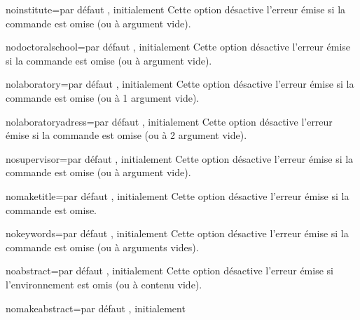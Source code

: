 \begin{description}
\begin{docKey}{noinstitute}{=\textbar{}}{par
    défaut , initialement }
  Cette option désactive l'erreur émise si la commande  est
  omise (ou à argument vide).
\end{docKey}
\begin{docKey}{nodoctoralschool}{=\textbar{}}{par
    défaut , initialement }
  Cette option désactive l'erreur émise si la commande 
  est omise (ou à argument vide).
\end{docKey}
\begin{docKey}{nolaboratory}{=\textbar{}}{par
    défaut , initialement }
  Cette option désactive l'erreur émise si la commande  est
  omise (ou à 1\ier{} argument vide).
\end{docKey}
\begin{docKey}{nolaboratoryadress}{=\textbar{}}{par
    défaut , initialement }
  Cette option désactive l'erreur émise si la commande  est
  omise (ou à 2\ieme{} argument vide).
\end{docKey}
\begin{docKey}{nosupervisor}{=\textbar{}}{par
    défaut , initialement }
  Cette option désactive l'erreur émise si la commande  est
  omise (ou à argument vide).
\end{docKey}
\begin{docKey}{nomaketitle}{=\textbar{}}{par
    défaut , initialement }
  Cette option désactive l'erreur émise si la commande  est
  omise.
\end{docKey}
\begin{docKey}{nokeywords}{=\textbar{}}{par défaut
    , initialement }
  Cette option désactive l'erreur émise si la commande  est
  omise (ou à arguments vides).
\end{docKey}
\begin{docKey}{noabstract}{=\textbar{}}{par défaut
    , initialement }
  Cette option désactive l'erreur émise si l'environnement 
  est omis (ou à contenu vide).
\end{docKey}
\begin{docKey}{nomakeabstract}{=\textbar{}}{par
    défaut , initialement }

\end{docKey}
\end{description}

